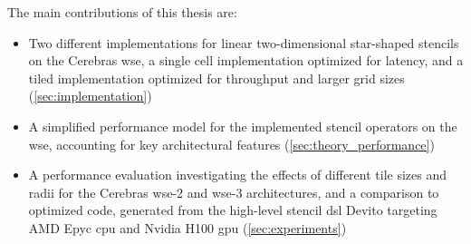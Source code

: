

The main contributions of this thesis are:
\begin{itemize}
    \item Two different implementations for linear two-dimensional star-shaped stencils on the Cerebras \ac{wse}, a single cell implementation optimized for latency, and a tiled implementation optimized for throughput and larger grid sizes (\autoref{sec:implementation})
    \item A simplified performance model for the implemented stencil operators on the \ac{wse}, accounting for key architectural features (\autoref{sec:theory_performance})
    \item A performance evaluation investigating the effects of different tile sizes and radii for the Cerebras \ac{wse}-2 and \ac{wse}-3 architectures, and a comparison to optimized code, generated from the high-level stencil \ac{dsl} Devito targeting AMD Epyc \ac{cpu} and Nvidia H100 \ac{gpu} (\autoref{sec:experiments})
\end{itemize}
